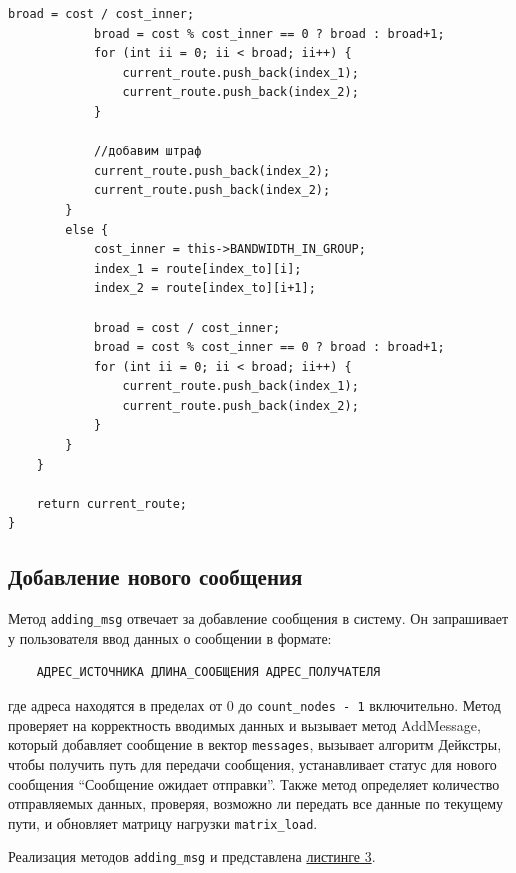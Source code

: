 \documentclass[11pt,a4paper,final]{article} %
\begin{document}
\begin{lstlisting}[label=lst2, caption = {Модифицированный алгоритм Дейкстры}]
			broad = cost / cost_inner;
			broad = cost % cost_inner == 0 ? broad : broad+1;
			for (int ii = 0; ii < broad; ii++) {
				current_route.push_back(index_1);
				current_route.push_back(index_2);
			}
			
			//добавим штраф
			current_route.push_back(index_2);
			current_route.push_back(index_2);
		}
		else {
			cost_inner = this->BANDWIDTH_IN_GROUP;
			index_1 = route[index_to][i];
			index_2 = route[index_to][i+1];
			
			broad = cost / cost_inner;
			broad = cost % cost_inner == 0 ? broad : broad+1;
			for (int ii = 0; ii < broad; ii++) {
				current_route.push_back(index_1);
				current_route.push_back(index_2);
			}
		}
	}
	
	return current_route;
}
\end{lstlisting}


\subsection{Добавление нового сообщения}
Метод \texttt{adding\_msg} отвечает за добавление сообщения в систему. Он запрашивает у пользователя ввод данных о сообщении в формате:
\begin{verbatim}
	АДРЕС_ИСТОЧНИКА ДЛИНА_СООБЩЕНИЯ АДРЕС_ПОЛУЧАТЕЛЯ
\end{verbatim}

где адреса находятся в пределах от 0 до \texttt{count\_nodes - 1} включительно.
Метод проверяет на корректность вводимых данных и вызывает метод AddMessage, который добавляет сообщение в вектор \texttt{messages}, вызывает алгоритм Дейкстры, чтобы получить путь для передачи сообщения, устанавливает статус для нового сообщения ``Сообщение ожидает отправки''. Также метод определяет количество отправляемых данных, проверяя, возможно ли передать все данные по текущему пути, и обновляет матрицу нагрузки \texttt{matrix\_load}.

Реализация методов \texttt{adding\_msg} и   представлена \hyperref[lst3]{листинге 3}.
\end{document}
